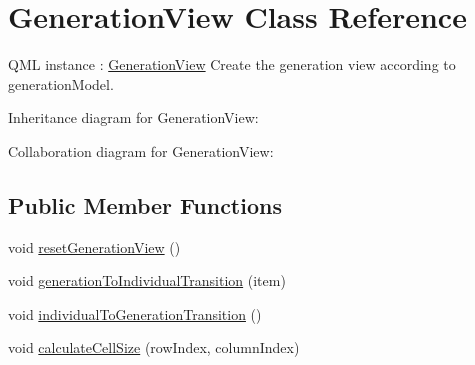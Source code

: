 \hypertarget{class_generation_view}{}\section{Generation\+View Class Reference}
\label{class_generation_view}


Q\+ML instance \+: \hyperlink{class_generation_view}{Generation\+View} Create the generation view according to generation\+Model.  




Inheritance diagram for Generation\+View\+:


Collaboration diagram for Generation\+View\+:
\subsection*{Public Member Functions}
\begin{DoxyCompactItemize}
\item 
void \hyperlink{class_generation_view_a3d76cb7eb28d72ae202474c0a991ae36}{reset\+Generation\+View} ()
\item 
void \hyperlink{class_generation_view_a866d1e3d016ea4ffc63da28791670171}{generation\+To\+Individual\+Transition} (item)
\item 
void \hyperlink{class_generation_view_ac5edb6d79f32d5dd3108e3d069e06ea9}{individual\+To\+Generation\+Transition} ()
\item 
void \hyperlink{class_generation_view_abd80b9783934a10769cfdd193494afcf}{calculate\+Cell\+Size} (row\+Index, column\+Index)
\end{DoxyCompactItemize}
